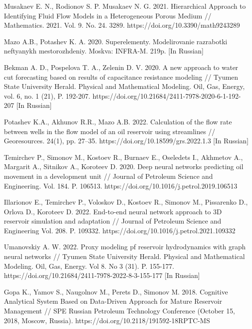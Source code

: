 \documentclass{article}
\begin{document}
\begin{thebibliography}{20}
	
 Musakaev E. N., Rodionov S. P. Musakaev N. G. 2021. Hierarchical Approach to Identifying Fluid Flow Models in a Heterogeneous Porous Medium // Mathematics. 2021. Vol. 9. No. 24. 3289. https://doi.org/10.3390/math9243289

 Mazo A.B., Potashev K. A. 2020. Superelementy. Modelirovanie razrabotki neftyanykh mestorozhdeniy. Moskva: INFRA-M. 219p. [In Russian]

 Bekman A. D., Pospelova T. A., Zelenin D. V. 2020. A new approach to water cut forecasting based on results of capacitance resistance modeling // Tyumen State University Herald. Physical and Mathematical Modeling. Oil, Gas, Energy, vol. 6, no. 1 (21), P. 192-207. https://doi.org/10.21684/2411-7978-2020-6-1-192-207 [In Russian]

 Potashev K.A., Akhunov R.R., Mazo A.B. 2022. Calculation of the flow rate between wells in the flow model of an oil reservoir using streamlines // Georesources. 24(1), pp. 27–35. https://doi.org/10.18599/grs.2022.1.3 [In Russian]

 Temirchev P., Simonov M., Kostoev R., Burnaev E., Oseledets I., Akhmetov A., Margarit A., Sitnikov A., Koroteev D. 2020. Deep neural networks predicting oil movement in a development unit // Journal of Petroleum Science and Engineering. Vol. 184. P. 106513. https://doi.org/10.1016/j.petrol.2019.106513

 Illarionov E., Temirchev P., Voloskov D., Kostoev R., Simonov M., Pissarenko D., Orlova D., Koroteev D. 2022. End-to-end neural network approach to 3D reservoir simulation and adaptation // Journal of Petroleum Science and Engineering Vol. 208. P. 109332. https://doi.org/10.1016/j.petrol.2021.109332

 Umanovskiy A. W. 2022. Proxy modeling pf reservoir hydrodynamics with graph neural networks // Tyumen State University Herald. Physical and Mathematical Modeling. Oil, Gas, Energy. Vol 8. No 3 (31). P. 155-177. https://doi.org/10.21684/2411-7978-2022-8-3-155-177 [In Russian]

 Gopa K., Yamov S., Naugolnov M., Perets D., Simonov M. 2018. Cognitive Analytical System Based on Data-Driven Approach for Mature Reservoir Management // SPE Russian Petroleum Technology Conference (October 15, 2018, Moscow, Russia). https://doi.org/10.2118/191592-18RPTC-MS


\end{thebibliography}
\end{document}
